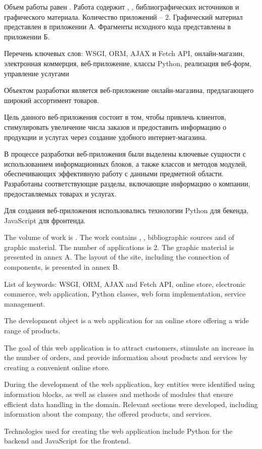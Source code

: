 
Объем работы равен . Работа содержит , ,  библиографических источников и  графического материала. Количество приложений – 2. Графический материал представлен в приложении А. Фрагменты исходного кода представлены в приложении Б.

Перечень ключевых слов: WSGI, ORM, AJAX и Fetch API, онлайн-магазин, электронная коммерция, веб-приложение, классы Python, реализация веб-форм, управление услугами

Объектом разработки является веб-приложение онлайн-магазина, предлагающего широкий ассортимент товаров.

Цель данного веб-приложения состоит в том, чтобы привлечь клиентов, стимулировать увеличение числа заказов и предоставить информацию о продукции и услугах через создание удобного интернет-магазина.

В процессе разработки веб-приложения были выделены ключевые сущности с использованием информационных блоков, а также классов и методов модулей, обеспечивающих эффективную работу с данными предметной области. Разработаны соответствующие разделы, включающие информацию о компании, предоставляемых товарах и услугах.

Для создания веб-приложения использовались технологии Python для бекенда, JavaScript для фронтенда.


  
The volume of work is . The work contains , ,  bibliographic sources and  of graphic material. The number of applications is 2. The graphic material is presented in annex A. The layout of the site, including the connection of components, is presented in annex B.


List of keywords: WSGI, ORM, AJAX and Fetch API, online store, electronic commerce, web application, Python classes, web form implementation, service management.

The development object is a web application for an online store offering a wide range of products.

The goal of this web application is to attract customers, stimulate an increase in the number of orders, and provide information about products and services by creating a convenient online store.

During the development of the web application, key entities were identified using information blocks, as well as classes and methods of modules that ensure efficient data handling in the domain. Relevant sections were developed, including information about the company, the offered products, and services.

Technologies used for creating the web application include Python for the backend and JavaScript for the frontend.


